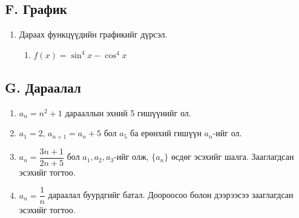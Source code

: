 \subsection*{F. График}
\begin{enumerate}[resume]
\item Дараах функцүүдийн графикийг дүрсэл.
\begin{enumerate}
  \item $f(x)=\sin^4x-\cos^4x$
\end{enumerate}
\end{enumerate}

\subsection*{G. Дараалал}
\begin{enumerate}[resume]
\item $a_n=n^2+1$ дарааллын эхний 5 гишүүнийг ол.
\item $a_1=2$, $a_{n+1}=a_n+5$ бол $a_5$ ба ерөнхий гишүүн $a_n$-ийг ол.
\item $a_n=\dfrac{3n+1}{2n+5}$ бол $a_1,a_2,a_3$-ийг олж, $\{a_n\}$ өсдөг эсэхийг шалга.
      Зааглагдсан эсэхийг тогтоо.
\item $a_n=\dfrac1n$ дараалал буурдгийг батал. Доороосоо болон дээрээсээ зааглагдсан эсэхийг тогтоо.
\end{enumerate}